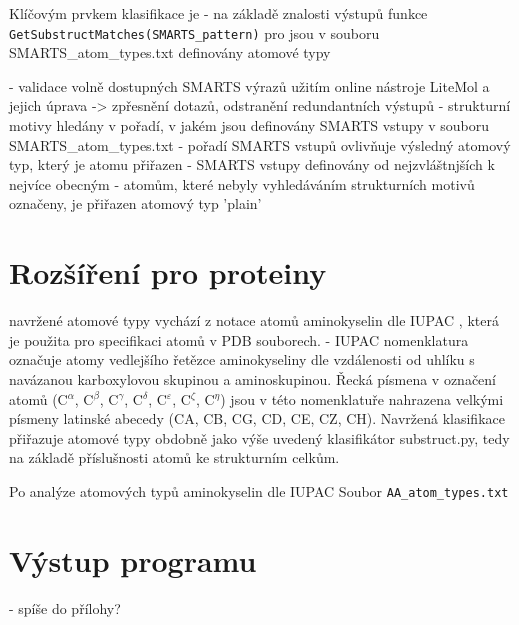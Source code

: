 Klíčovým prvkem klasifikace je 
- na základě znalosti výstupů funkce \verb|GetSubstructMatches(SMARTS_pattern)| pro jsou v souboru SMARTS\_atom\_types.txt definovány atomové typy 


- validace volně dostupných SMARTS výrazů užitím online nástroje LiteMol a jejich úprava -> zpřesnění dotazů, odstranění redundantních výstupů 
- strukturní motivy hledány v pořadí, v jakém jsou definovány SMARTS vstupy v souboru SMARTS\_atom\_types.txt - pořadí SMARTS vstupů ovlivňuje výsledný atomový typ, který je atomu přiřazen
- SMARTS vstupy definovány od nejzvláštnjších k nejvíce obecným 
- atomům, které nebyly vyhledáváním strukturních motivů označeny, je přiřazen atomový typ 'plain'



\section{Rozšíření pro proteiny}
navržené atomové typy vychází z notace atomů aminokyselin dle IUPAC \cite{AA_nomenclature}, která je použita pro specifikaci atomů v PDB souborech. 
- IUPAC nomenklatura označuje atomy vedlejšího řetězce aminokyseliny dle vzdálenosti od uhlíku s navázanou karboxylovou skupinou a aminoskupinou. Řecká písmena v označení atomů (C$^\alpha$, C$^\beta$, C$^\gamma$, C$^\delta$, C$^\varepsilon$, C$^\zeta$, C$^\eta$) jsou v této nomenklatuře nahrazena velkými písmeny latinské abecedy (CA, CB, CG, CD, CE, CZ, CH). Navržená klasifikace přiřazuje atomové typy obdobně jako výše uvedený klasifikátor substruct.py, tedy na základě příslušnosti atomů ke strukturním celkům.

Po analýze atomových typů aminokyselin dle IUPAC Soubor \verb|AA_atom_types.txt| 

\section{Výstup programu}
 - spíše do přílohy?


